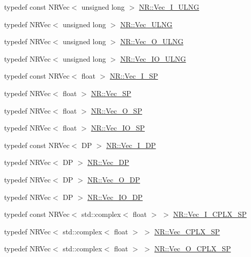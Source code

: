 \begin{DoxyCompactItemize}
typedef const N\+R\+Vec$<$ unsigned long $>$ \mbox{\hyperlink{namespaceNR_a117570729decc729db86f7655e7a23e5}{N\+R\+::\+Vec\+\_\+\+I\+\_\+\+U\+L\+NG}}
\item 
typedef N\+R\+Vec$<$ unsigned long $>$ \mbox{\hyperlink{namespaceNR_a5c7370f8964ba27e0aa18ff2b2516734}{N\+R\+::\+Vec\+\_\+\+U\+L\+NG}}
\item 
typedef N\+R\+Vec$<$ unsigned long $>$ \mbox{\hyperlink{namespaceNR_a111b6302e9ace403b90a1d801f0c70a2}{N\+R\+::\+Vec\+\_\+\+O\+\_\+\+U\+L\+NG}}
\item 
typedef N\+R\+Vec$<$ unsigned long $>$ \mbox{\hyperlink{namespaceNR_a3b5de5b305729eeca6289dfee2a39229}{N\+R\+::\+Vec\+\_\+\+I\+O\+\_\+\+U\+L\+NG}}
\item 
typedef const N\+R\+Vec$<$ float $>$ \mbox{\hyperlink{namespaceNR_a71d18e93c460e6909aea027558a47cf5}{N\+R\+::\+Vec\+\_\+\+I\+\_\+\+SP}}
\item 
typedef N\+R\+Vec$<$ float $>$ \mbox{\hyperlink{namespaceNR_af83af2cf4cf885729545ae16ad25607b}{N\+R\+::\+Vec\+\_\+\+SP}}
\item 
typedef N\+R\+Vec$<$ float $>$ \mbox{\hyperlink{namespaceNR_ab5c69ea1aee9a86bcaed5efdcc803162}{N\+R\+::\+Vec\+\_\+\+O\+\_\+\+SP}}
\item 
typedef N\+R\+Vec$<$ float $>$ \mbox{\hyperlink{namespaceNR_a761149b0404c64b2a5a0357c44d80b19}{N\+R\+::\+Vec\+\_\+\+I\+O\+\_\+\+SP}}
\item 
typedef const N\+R\+Vec$<$ DP $>$ \mbox{\hyperlink{namespaceNR_a9f943da53862537c552e2a770cb170ae}{N\+R\+::\+Vec\+\_\+\+I\+\_\+\+DP}}
\item 
typedef N\+R\+Vec$<$ DP $>$ \mbox{\hyperlink{namespaceNR_a115a3196718c98e8e2562d80b06c23c5}{N\+R\+::\+Vec\+\_\+\+DP}}
\item 
typedef N\+R\+Vec$<$ DP $>$ \mbox{\hyperlink{namespaceNR_a970094d23441f8ef6a45282a7eb2103d}{N\+R\+::\+Vec\+\_\+\+O\+\_\+\+DP}}
\item 
typedef N\+R\+Vec$<$ DP $>$ \mbox{\hyperlink{namespaceNR_ab293e06a6bf799d8a7ed932b6852bcb8}{N\+R\+::\+Vec\+\_\+\+I\+O\+\_\+\+DP}}
\item 
typedef const N\+R\+Vec$<$ std\+::complex$<$ float $>$ $>$ \mbox{\hyperlink{namespaceNR_a34f5160508711dfeeabf170c44c6d813}{N\+R\+::\+Vec\+\_\+\+I\+\_\+\+C\+P\+L\+X\+\_\+\+SP}}
\item 
typedef N\+R\+Vec$<$ std\+::complex$<$ float $>$ $>$ \mbox{\hyperlink{namespaceNR_a3bb807d9aeb8d5c1d651fbc7ceb3a45b}{N\+R\+::\+Vec\+\_\+\+C\+P\+L\+X\+\_\+\+SP}}
\item 
typedef N\+R\+Vec$<$ std\+::complex$<$ float $>$ $>$ \mbox{\hyperlink{namespaceNR_a48e7d2833db243f92c964077383c261f}{N\+R\+::\+Vec\+\_\+\+O\+\_\+\+C\+P\+L\+X\+\_\+\+SP}}

\end{DoxyCompactItemize}
